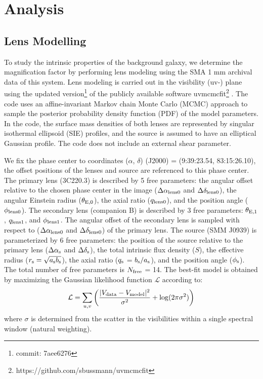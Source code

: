 \documentclass[twocolumn,apj,numberedappendix]{emulateapj}
\begin{document}
\section{Analysis}
\subsection{Lens Modelling} \label{sec:Lens} 
To study the intrinsic properties of the background galaxy, we determine the magnification factor by performing
lens modeling using the SMA 1 mm archival data of this system. Lens modeling is carried out in the visibility
(uv-) plane using the updated version\footnote{commit: 7aee6276} of the publicly available software {\sc uvmcmcfit}\footnote{https://github.com/sbussmann/uvmcmcfit}
\citep{Bussmann15a}. The code uses an affine-invariant Markov chain Monte Carlo (MCMC) approach to sample the posterior
probability density function (PDF) of the model parameters. In the code, the surface mass densities of both
lenses are represented by singular isothermal ellipsoid (SIE) profiles, and the source is assumed to have an
elliptical Gaussian profile. The code does not include an external shear parameter.

We fix the phase center to coordinates ($\alpha$, $\delta$) (J2000) = (9:39:23.54, 83:15:26.10), the
offset positions of the lenses and source are referenced to this phase center. The primary lens (3C220.3) is
described by 5 free parameters: the angular offset relative to
the chosen phase center in the image ($\Delta \alpha_{\rm
lens0}$ and $\Delta \delta_{\rm lens0}$), the angular Einstein radius ($\theta_{\rm E,0}$), the
axial ratio ($q_{\rm lens0}$), and the position angle ($\phi_{\rm lens0}$). The secondary lens (companion B) is
described by 3 free parameters: $\theta_{\rm E,1}$, $q_{\rm lens1}$, and $\phi_{\rm lens1}$. The angular offset
of the secondary
lens is sampled with respect to ($\Delta \alpha_{\rm lens0}$ and $\Delta \delta_{\rm lens0}$) of
the primary lens.
The source (SMM J0939) is parameterized by
6 free parameters: the position of the source relative to the
primary lens ($\Delta \alpha_{\rm s}$ and $\Delta
\delta_{\rm s}$), the total intrinsic flux density ($S$), the
effective radius ($r_{\rm s} = \sqrt{a_{\rm s} b_{\rm s}}$), the axial
ratio ($q_{\rm s}$ =  $b_{\rm s}/a_{\rm s}$), and the position angle
($\phi_{\rm s}$).
The total number of free parameters is $N_{\rm free}$ = 14. The best-fit model is obtained by maximizing the
Gaussian likelihood function $ \mathcal{L} $ according to:
\begin{equation}
    \mathcal{L} = \sum_{u, v}\left( \frac{|V_{\rm data} - V_{\rm
    model}|^2}{\sigma^2} + {\rm log}(2 \pi \sigma^2) \right)
\end{equation}
\noindent where $\sigma$ is determined from the scatter in the visibilities within a
single spectral window (natural weighting).
\end{document}
